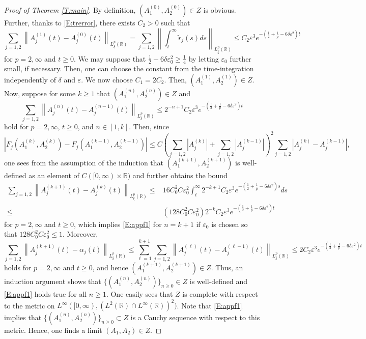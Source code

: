 \documentclass[11pt,a4paper,oneside]{amsart}
\theoremstyle{plain}
\theoremstyle{remark}
\numberwithin{equation}{section}
\newcommand{\R}{\mathbb{R}}
\newcommand{\norm}[1]{\left\lVert #1\right\rVert}
\def\({\left(}
\def\){\right)}
\def\le{\leqslant}
\def\ge{\geqslant}
\newcommand{\eps}{\varepsilon}
\theoremstyle{definition}
\begin{document}
\begin{proof}[Proof of Theorem \ref{T:main}]
By definition, $(A_1^{(0)},A_2^{(0)}) \in Z$ is obvious.
Further, thanks to \eqref{E:trerror}, there exists $C_2>0$ such that 
\[
	\sum_{j=1,2} \norm{A_j^{(1)}(t)-A_j^{(0)}(t)}_{L^p_\xi (\R)}=\sum_{j=1,2} \norm{\int_t^\infty \widetilde{r}_j(s)ds}_{L^p_\xi (\R)} \le C_2 \eps^3 e^{-(\frac12+\frac1p-6\delta \eps^2 )t}
\]
for $p=2,\infty$ and $t\ge0$.
We may suppose that $\frac12-6\delta \eps_0^2\ge \frac14$  by letting $\eps_0$ further small, if necessary.
Then, one can choose the constant from the time-integration independently of $\delta$ and $\eps$. 
We now choose $C_1=2C_2$. Then,
$(A_1^{(1)},A_2^{(1)}) \in Z$.
Now, suppose for some $k\ge1$ that
$(A_1^{(n)},A_2^{(n)}) \in Z$ and 
\begin{equation}\label{E:appf1}
	\sum_{j=1,2} \norm{A_j^{(n)}(t)-A_j^{(n-1)}(t)}_{L^p_\xi (\R)} \le 2^{-n+1}C_2 \eps^3 e^{-(\frac12+\frac1p-6\delta \eps^2 )t}	
\end{equation}
hold for $p=2,\infty$, $t\ge0$, and $n\in [1,k]$.
Then, since
\[
	|F_j(A_1^{(k)},A_2^{(k)})-F_j(A_1^{(k-1)},A_2^{(k-1)})| \le
	C\(\sum_{j=1,2}|A_j^{(k)}|+\sum_{j=1,2}|A_j^{(k-1)}|\)^2 \sum_{j=1,2} |A_j^{(k)}-A_j^{(k-1)}|  ,
\]
one sees from the assumption of the induction that $(A_1^{(k+1)},A_2^{(k+1)})$
is well-defined as an element of $C([0,\infty)\times\R)$ and
further obtains the bound
\begin{align*}
	\sum_{j=1,2} \norm{A_j^{(k+1)}(t)-A_j^{(k)}(t)}_{L^p_\xi (\R)}
\le{}& 16 C_0^2 C \eps_0^2 \int_t^\infty
2^{-k+1}C_2 \eps^3 e^{-(\frac12+\frac1{p}-6\delta \eps^2 )s}ds \\
\le {}& (128C_0^2 C \eps_0^2 )
2^{-k}C_2 \eps^3 e^{-(\frac12+\frac1p-6\delta \eps^2 )t}
\end{align*}
for $p=2,\infty$ and $t\ge0$,
which implies \eqref{E:appf1} for $n=k+1$ if $\eps_0$ is chosen so that $128C_0^2 C \eps_0^2  \le1$.
Moreover, 
\[
	\sum_{j=1,2} \norm{A_j^{(k+1)}(t)-\alpha_j(t)}_{L^p_\xi (\R)}
\le \sum_{\ell=1}^{k+1} \sum_{j=1,2} \norm{A_j^{(\ell)}(t)-A_j^{(\ell-1)}(t)}_{L^p_\xi (\R)}
\le 2C_2 \eps^3 e^{-(\frac12+\frac1p-6\delta \eps^2 )t}
\]
holds for $p=2,\infty$ and $t\ge0$,
and hence $(A_1^{(k+1)},A_2^{(k+1)}) \in Z$.
Thus, an induction argument shows that
$\{ (A_1^{(n)},A_2^{(n)}) \}_{n\ge0}\in Z$ is well-defined 
and \eqref{E:appf1} holds true for all $n\ge1$.
One easily sees that $Z$ is complete with respect to the metric on $L^\infty ([0,\infty), (L^2(\R) \cap L^\infty(\R))^2 )$. Note that \eqref{E:appf1} implies that $\{ (A_1^{(n)},A_2^{(n)}) \}_{n\ge0}\subset Z$ is a Cauchy sequence with respect to this metric.
Hence, one finds a limit $(A_1,A_2) \in Z$.


\end{proof}
\end{document}
